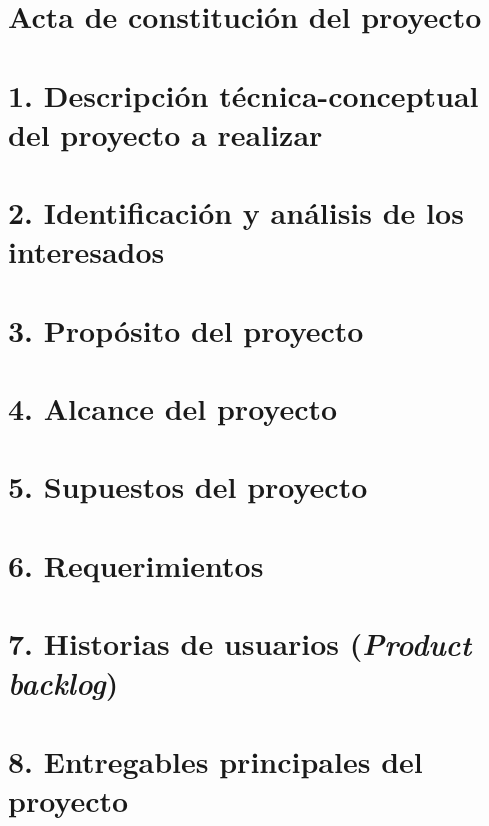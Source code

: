 \documentclass[
11pt, %
codirector, %
]{charter}
\begin{document}
\pagebreak



\section*{Acta de constitución del proyecto}
\label{sec:acta}


\section{1. Descripción técnica-conceptual del proyecto a realizar}
\label{sec:descripcion}



\section{2. Identificación y análisis de los interesados}
\label{sec:interesados}


\section{3. Propósito del proyecto}
\label{sec:proposito}


\section{4. Alcance del proyecto}
\label{sec:alcance}


\section{5. Supuestos del proyecto}
\label{sec:supuestos}


\section{6. Requerimientos}
\label{sec:requerimientos}


\section{7. Historias de usuarios (\textit{Product backlog})}
\label{sec:backlog}


\section{8. Entregables principales del proyecto}
\label{sec:entregables}

\end{document}
